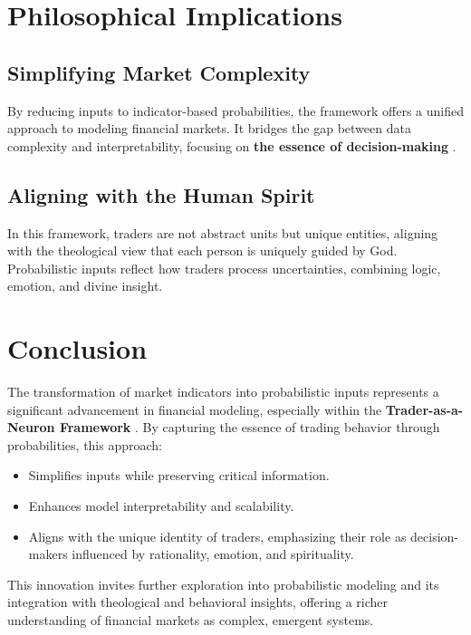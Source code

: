\documentclass[a4]{article}
\begin{document}
\section{Philosophical Implications}

\subsection{Simplifying Market Complexity}

By reducing inputs to indicator-based probabilities, the framework offers a unified approach to modeling financial markets. It bridges the gap between data complexity and interpretability, focusing on {\bf the essence of decision-making} .

\subsection{Aligning with the Human Spirit}

In this framework, traders are not abstract units but unique entities, aligning with the theological view that each person is uniquely guided by God. Probabilistic inputs reflect how traders process uncertainties, combining logic, emotion, and divine insight.



\section{Conclusion}

The transformation of market indicators into probabilistic inputs represents a significant advancement in financial modeling, especially within the {\bf Trader-as-a-Neuron Framework} . By capturing the essence of trading behavior through probabilities, this approach:

\begin{itemize}
\item  Simplifies inputs while preserving critical information.
\item Enhances model interpretability and scalability.
\item Aligns with the unique identity of traders, emphasizing their role as decision-makers influenced by rationality, emotion, and spirituality.
\end{itemize}

This innovation invites further exploration into probabilistic modeling and its integration with theological and behavioral insights, offering a richer understanding of financial markets as complex, emergent systems.
\end{document}
